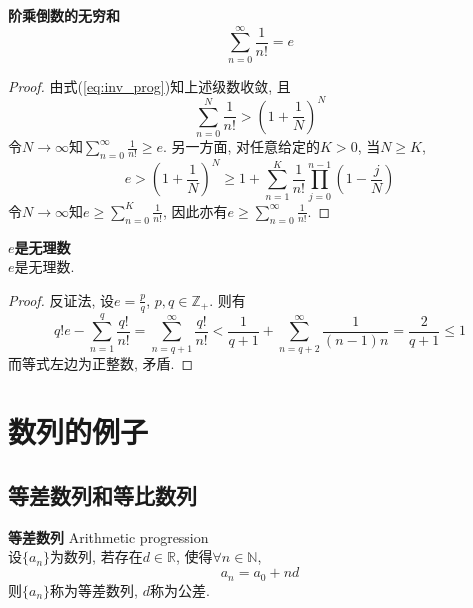 \begin{pro}\textbf{阶乘倒数的无穷和}\\
\begin{equation}
    \sum_{n=0}^{\infty} \frac{1}{n!} = e
\end{equation}
\end{pro}
\begin{proof}
由式(\ref{eq:inv_prog})知上述级数收敛, 且
\begin{equation}
    \sum_{n=0}^{N} \frac{1}{n!}>\left(1+\frac{1}{N}\right)^N
\end{equation}
令$N\to \infty$知$\sum_{n=0}^{\infty} \frac{1}{n!} \ge  e$. 另一方面, 对任意给定的$K>0$, 当$N\ge K$, 
\begin{equation}
    e > \left(1+\frac{1}{N}\right)^N \ge 1+ \sum_{n=1}^{K} \frac{1}{n!}\prod_{j=0}^{n-1} \left(1-\frac{j}{N}\right)
\end{equation}
令$N\to \infty$知$e \ge \sum_{n=0}^{K}  \frac{1}{n!}$, 因此亦有$e \ge \sum_{n=0}^{\infty}  \frac{1}{n!}$.
\end{proof}

\begin{col}\textbf{$e$是无理数}\\
$e$是无理数.
\end{col}
\begin{proof}
反证法, 设$e=\frac{p}{q}$, $p,q \in \mathbb{Z}_+$. 则有
\begin{equation}
    q!e-\sum_{n=1}^q \frac{q!}{n!}=\sum_{n=q+1}^{\infty} \frac{q!}{n!}<\frac{1}{q+1}+\sum_{n=q+2}^{\infty} \frac{1}{(n-1)n}=\frac{2}{q+1}\le 1
\end{equation}
而等式左边为正整数, 矛盾. 
\end{proof}

\section{数列的例子}

\subsection{等差数列和等比数列}

\begin{dfn}\textbf{等差数列} Arithmetic progression\\
设$\{a_n\}$为数列, 若存在$d\in \mathbb{R}$, 使得$\forall n\in \mathbb{N}$, 
\begin{equation}
    a_n=a_0+nd
\end{equation}
则$\{a_n\}$称为等差数列, $d$称为公差. 
\end{dfn}


